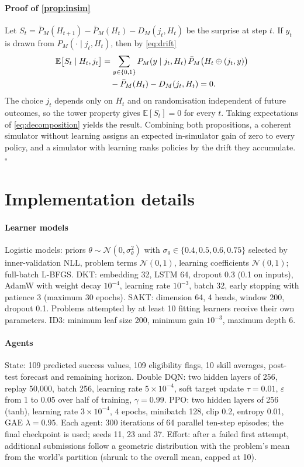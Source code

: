 \documentclass[a4paper,preprint,12pt,authoryear]{elsarticle}
\begin{document}
\paragraph{Proof of \cref{prop:insim}} Let $S_t=\bar P_M(H_{t+1})-\bar P_M(H_t)-D_M(j_t,H_t)$ be the surprise at step $t$. If $y_t$ is drawn from $P_M(\cdot\mid j_t,H_t)$, then by \cref{eq:drift}
\begin{align}
\mathbb E\bigl[S_t\mid H_t,j_t\bigr]
&=\sum_{y\in\{0,1\}}P_M(y\mid j_t,H_t)\,\bar P_M\bigl(H_t\oplus(j_t,y)\bigr)\notag\\
&\quad-\bar P_M(H_t)-D_M(j_t,H_t)=0.
\end{align}
The choice $j_t$ depends only on $H_t$ and on randomisation independent of future outcomes, so the tower property gives $\mathbb E[S_t]=0$ for every $t$. Taking expectations of \cref{eq:decomposition} yields the result. Combining both propositions, a coherent simulator without learning assigns an expected in-simulator gain of zero to every policy, and a simulator with learning ranks policies by the drift they accumulate. $\square$

\section{Implementation details}\label{app:impl}

\paragraph{Learner models} Logistic models: priors $\theta\sim\mathcal N(0,\sigma_\theta^2)$ with $\sigma_\theta\in\{0.4,0.5,0.6,0.75\}$ selected by inner-validation NLL, problem terms $\mathcal N(0,1)$, learning coefficients $\mathcal N(0,1)$; full-batch L-BFGS. DKT: embedding 32, LSTM 64, dropout 0.3 (0.1 on inputs), AdamW with weight decay $10^{-4}$, learning rate $10^{-3}$, batch 32, early stopping with patience 3 (maximum 30 epochs). SAKT: dimension 64, 4 heads, window 200, dropout 0.1. Problems attempted by at least 10 fitting learners receive their own parameters. ID3: minimum leaf size 200, minimum gain $10^{-3}$, maximum depth 6.

\paragraph{Agents} State: 109 predicted success values, 109 eligibility flags, 10 skill averages, post-test forecast and remaining horizon. Double DQN: two hidden layers of 256, replay 50,000, batch 256, learning rate $5\times10^{-4}$, soft target update $\tau=0.01$, $\varepsilon$ from 1 to 0.05 over half of training, $\gamma=0.99$. PPO: two hidden layers of 256 (tanh), learning rate $3\times10^{-4}$, 4 epochs, minibatch 128, clip 0.2, entropy 0.01, GAE $\lambda=0.95$. Each agent: 300 iterations of 64 parallel ten-step episodes; the final checkpoint is used; seeds 11, 23 and 37. Effort: after a failed first attempt, additional submissions follow a geometric distribution with the problem's mean from the world's partition (shrunk to the overall mean, capped at 10).
\end{document}
